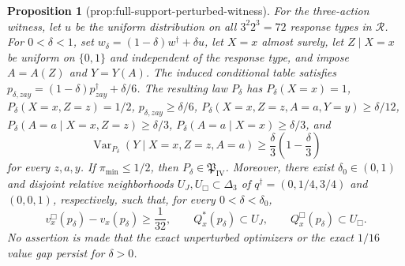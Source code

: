 \documentclass{article}
\newtheorem{proposition}{Proposition}
\begin{document}
\begin{proposition}[prop:full-support-perturbed-witness]\label{prop:full-support-perturbed-witness}
For the three-action witness, let \(u\) be the uniform distribution on all \(3^2 2^3=72\) response types in \(\mathcal R\).  For \(0<\delta<1\), set \(w_\delta=(1-\delta)w^\dagger+\delta u\), let \(X=x\) almost surely, let \(Z\mid X=x\) be uniform on \(\{0,1\}\) and independent of the response type, and impose \(A=A(Z)\) and \(Y=Y(A)\).  The induced conditional table satisfies \(p_{\delta,zay}=(1-\delta)p^\dagger_{zay}+\delta/6\).  The resulting law \(P_\delta\) has \(P_\delta(X=x)=1\), \(P_\delta(X=x,Z=z)=1/2\), \(p_{\delta,zay}\geq\delta/6\), \(P_\delta(X=x,Z=z,A=a,Y=y)\geq\delta/12\), \(P_\delta(A=a\mid X=x,Z=z)\geq\delta/3\), \(P_\delta(A=a\mid X=x)\geq\delta/3\), and
\[
 \operatorname{Var}_{P_\delta}(Y\mid X=x,Z=z,A=a)
 \geq \frac{\delta}{3}\left(1-\frac{\delta}{3}\right)
\]
for every \(z,a,y\).  If \(\pi_{\min}\leq1/2\), then \(P_\delta\in\mathfrak P_{\mathrm{IV}}\).  Moreover, there exist \(\delta_0\in(0,1)\) and disjoint relative neighborhoods \(U_J,U_{\Box}\subset\Delta_3\) of \(q^\dagger=(0,1/4,3/4)\) and \((0,0,1)\), respectively, such that, for every \(0<\delta<\delta_0\),
\[
 v_x^{\Box}(p_\delta)-v_x(p_\delta)\geq\frac1{32},
 \qquad
 Q_x^*(p_\delta)\subset U_J,
 \qquad
 Q_x^{\Box}(p_\delta)\subset U_{\Box}.
\]
No assertion is made that the exact unperturbed optimizers or the exact \(1/16\) value gap persist for \(\delta>0\).
\end{proposition}
\end{document}
